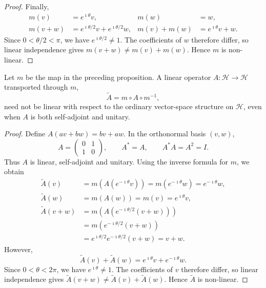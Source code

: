 \documentclass{techbrief}
\begin{document}
\begin{proof}
	Finally,
	\begin{equation*}
		\begin{aligned}
			m(v)&=e^{\imath\theta}v,
			& m(w)&=w,\\
			m(v+w)&=e^{\imath\theta/2}v+e^{\imath\theta/2}w,
			& m(v)+m(w)&=e^{\imath\theta}v+w.
		\end{aligned}
	\end{equation*}
	Since $0<\theta/2<\pi$, we have $e^{\imath\theta/2}\neq1$. The coefficients of $w$ therefore differ, so linear independence gives $m(v+w)\neq m(v)+m(w)$. Hence $m$ is non-linear.
\end{proof}

\begin{coro}\label{nonlinearOperators}
	Let $m$ be the map in the preceding proposition. A linear operator
	$A:\mathcal{H}\to\mathcal{H}$ transported through $m$,
	\begin{equation*}
		\widetilde A=m\circ A\circ m^{-1},
	\end{equation*}
	need not be linear with respect to the ordinary vector-space
	structure on $\mathcal{H}$, even when $A$ is both self-adjoint
	and unitary.
\end{coro}

\begin{proof}
	Define $A(av+bw)=bv+aw$. In the orthonormal basis $(v,w)$,
	\begin{equation*}
		A=\begin{pmatrix}0&1\\1&0\end{pmatrix},
		\qquad
		A^*=A,
		\qquad
		A^*A=A^2=I.
	\end{equation*}
	Thus $A$ is linear, self-adjoint and unitary. Using the inverse
	formula for $m$, we obtain
	\begin{equation*}
		\begin{aligned}
			\widetilde A(v)
			&=m\!\left(A(e^{-\imath\theta}v)\right)
			=m(e^{-\imath\theta}w)
			=e^{-\imath\theta}w,\\
			\widetilde A(w)
			&=m(A(w))=m(v)=e^{\imath\theta}v,\\
			\widetilde A(v+w)
			&=m\!\left(A(e^{-\imath\theta/2}(v+w))\right)\\
			&=m(e^{-\imath\theta/2}(v+w))\\
			&=e^{\imath\theta/2}e^{-\imath\theta/2}(v+w)
			=v+w.
		\end{aligned}
	\end{equation*}
	However,
	\begin{equation*}
		\widetilde A(v)+\widetilde A(w)
		=e^{\imath\theta}v+e^{-\imath\theta}w.
	\end{equation*}
	Since $0<\theta<2\pi$, we have $e^{\imath\theta}\neq1$.
	The coefficients of $v$ therefore differ, so linear independence gives
	$\widetilde A(v+w)\neq\widetilde A(v)+\widetilde A(w)$.
	Hence $\widetilde A$ is non-linear.
\end{proof}
\end{document}
